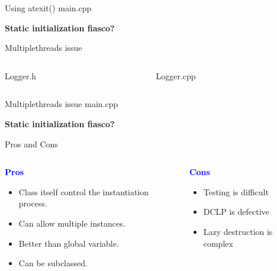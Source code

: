 \documentclass[13pt]{beamer}
\begin{document}
\begin{frame}{Using atexit()}
main.cpp
\lstset{basicstyle=\tiny,style=myCustomCppStyle}

\textbf{Static initialization fiasco?}
\end{frame}

\begin{frame}{Multiplethreads issue}
\begin{columns}[T]
\begin{column}{.48\textwidth}
Logger.h
\lstset{basicstyle=\tiny,style=myCustomCppStyle}

\end{column}

\begin{column}{.48\textwidth}
Logger.cpp
\lstset{basicstyle=\tiny,style=myCustomCppStyle}

\end{column}
\end{columns}
\end{frame}

\begin{frame}{Multiplethreads issue}
main.cpp
\lstset{basicstyle=\tiny,style=myCustomCppStyle}

\textbf{Static initialization fiasco?}
\end{frame}

\begin{frame}{Pros and Cons}
\begin{columns}[T]
\begin{column}{.48\textwidth}
	\begin{center}
	\textcolor{blue}{\textbf{Pros}}
	\end{center}
	\begin{itemize}
		\setlength\itemsep{1em}
		\item Class itself control the instantiation process.
		\item Can allow multiple instances.
		\item Better than global variable.
		\item Can be subclassed.
	\end{itemize}
\end{column}
\begin{column}{.48\textwidth}
	\begin{center}
	\textcolor{blue}{\textbf{Cons}}
	\end{center}
		\begin{itemize}
		\setlength\itemsep{1em}
		\item Testing is difficult
		\item DCLP is defective
		\item Lazy destruction is complex
	\end{itemize}
\end{column}
\end{columns}
\end{frame}
\end{document}
